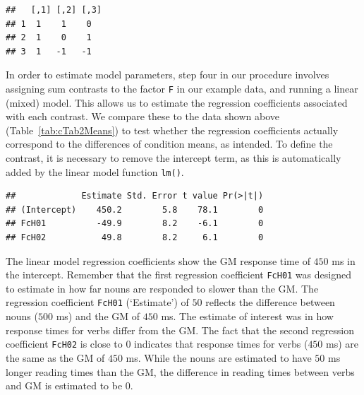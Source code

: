 \documentclass[12pt,]{krantz}
\newenvironment{Shaded}{\begin{snugshade}}{\end{snugshade}}
\newcommand{\DataTypeTok}[1]{\textcolor[rgb]{0.13,0.29,0.53}{#1}}
\newcommand{\DecValTok}[1]{\textcolor[rgb]{0.00,0.00,0.81}{#1}}
\newcommand{\KeywordTok}[1]{\textcolor[rgb]{0.13,0.29,0.53}{\textbf{#1}}}
\newcommand{\NormalTok}[1]{#1}
\newcommand{\OperatorTok}[1]{\textcolor[rgb]{0.81,0.36,0.00}{\textbf{#1}}}
\newcommand{\StringTok}[1]{\textcolor[rgb]{0.31,0.60,0.02}{#1}}
\begin{document}
\begin{verbatim}
##   [,1] [,2] [,3]
## 1  1    1    0  
## 2  1    0    1  
## 3  1   -1   -1
\end{verbatim}

In order to estimate model parameters, step four in our procedure involves assigning sum contrasts to the factor \texttt{F} in our example data, and running a linear (mixed) model. This allows us to estimate the regression coefficients associated with each contrast. We compare these to the data shown above (Table~\ref{tab:cTab2Means}) to test whether the regression coefficients actually correspond to the differences of condition means, as intended. To define the contrast, it is necessary to remove the intercept term, as this is automatically added by the linear model function \texttt{lm()}.

\begin{Shaded}
\end{Shaded}

\begin{Shaded}
\end{Shaded}

\begin{verbatim}
##             Estimate Std. Error t value Pr(>|t|)
## (Intercept)    450.2        5.8    78.1        0
## FcH01          -49.9        8.2    -6.1        0
## FcH02           49.8        8.2     6.1        0
\end{verbatim}

The linear model regression coefficients show the GM response time of \(450\) ms in the intercept. Remember that the first regression coefficient \texttt{FcH01} was designed to estimate in how far nouns are responded to slower than the GM. The regression coefficient \texttt{FcH01} (`Estimate') of \(50\) reflects the difference between nouns (\(500\) ms) and the GM of \(450\) ms. The estimate of interest was in how response times for verbs differ from the GM. The fact that the second regression coefficient \texttt{FcH02} is close to \(0\) indicates that response times for verbs (\(450\) ms) are the same as the GM of \(450\) ms. While the nouns are estimated to have \(50\) ms longer reading times than the GM, the difference in reading times between verbs and GM is estimated to be \(0\).
\end{document}
